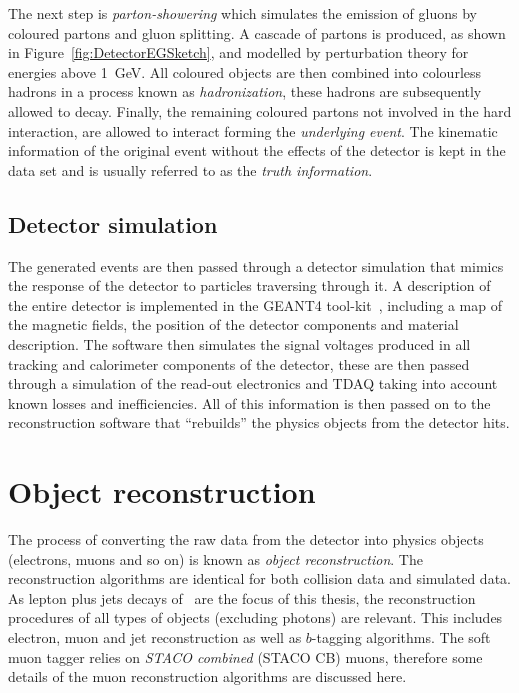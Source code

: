 The next step is \emph{parton-showering} which simulates the emission of gluons by coloured partons and gluon splitting. A cascade of partons is produced, as shown in Figure~\ref{fig:DetectorEGSketch}, and modelled by perturbation theory for energies above \SI{1}{GeV}. All coloured objects are then combined into colourless hadrons in a process known as \emph{hadronization}, these hadrons are subsequently allowed to decay. Finally, the remaining coloured partons not involved in the hard interaction, are allowed to interact forming the \emph{underlying event}. The kinematic information of the original event without the effects of the detector is kept in the data set and is usually referred to as the \emph{truth information}.

\subsection{Detector simulation} \label{sec:DetectorSimulation}

The generated events are then passed through a detector simulation that mimics the response of the detector to particles traversing through it. A description of the entire detector is implemented in the GEANT4 tool-kit~\cite{Detector:Geant4}, including a map of the magnetic fields, the position of the detector components and material description. The software then simulates the signal voltages produced in all tracking and calorimeter components of the detector, these are then passed through a simulation of the read-out electronics and TDAQ taking into account known losses and inefficiencies. All of this information is then passed on to the reconstruction software that ``rebuilds'' the physics objects from the detector hits.

\section{Object reconstruction} \label{sec:DetectorEventReco}

The process of converting the raw data from the detector into physics objects (electrons, muons and so on) is known as \emph{object reconstruction}. The reconstruction algorithms are identical for both collision data and simulated data. As lepton plus jets decays of \ttbar\ are the focus of this thesis, the reconstruction procedures of all types of objects (excluding photons) are relevant. This includes electron, muon and jet reconstruction as well as $b$-tagging algorithms. The soft muon tagger relies on \emph{STACO combined} (STACO CB) muons, therefore some details of the muon reconstruction algorithms are discussed here.

